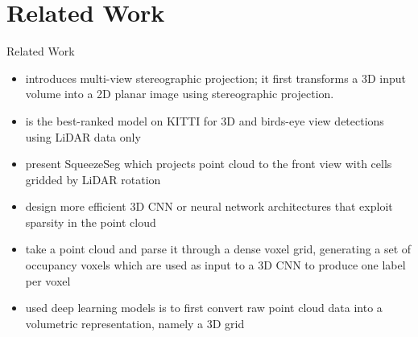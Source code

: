 \documentclass[9pt]{beamer}
\begin{document}
\section{Related Work}
\begin{frame}[fragile]{Related Work}

	\begin{itemize}
		\item  \cite{DBLP:journals/corr/abs-1811-01571}
		introduces multi-view stereographic projection; it first transforms a 3D input volume into a 2D planar image using stereographic projection.

		\item \cite{Zhou_2018_CVPR} is the best-ranked model on KITTI \cite{geiger2012we} for 3D and birds-eye view detections using LiDAR data only

		\item \cite{DBLP:conf/icra/WuWYK18} present SqueezeSeg which projects point cloud to the front view with cells gridded by LiDAR rotation

		\item \cite{DBLP:conf/cvpr/RieglerUG17} design more efficient 3D CNN or neural network architectures that exploit sparsity in the point cloud

		\item \cite{DBLP:conf/icpr/HuangY16} take a point cloud and parse it through a dense voxel grid, generating a set of occupancy voxels which are used as input to a 3D CNN to produce one label per voxel

		\item \cite{DBLP:conf/iros/MaturanaS15} used deep learning models is to first convert raw point cloud data into a
		volumetric representation, namely a 3D grid



	\end{itemize}

\end{frame}
\end{document}

